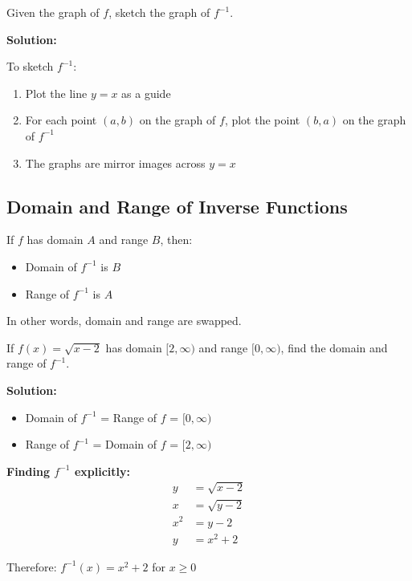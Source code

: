 \documentclass[12pt,a4paper]{article}
\begin{document}
\begin{example}
Given the graph of $f$, sketch the graph of $f^{-1}$.

\textbf{Solution:}

To sketch $f^{-1}$:
\begin{enumerate}
    \item Plot the line $y = x$ as a guide
    \item For each point $(a, b)$ on the graph of $f$, plot the point $(b, a)$ on the graph of $f^{-1}$
    \item The graphs are mirror images across $y = x$
\end{enumerate}
\end{example}

\subsection{Domain and Range of Inverse Functions}

\begin{theorem}
If $f$ has domain $A$ and range $B$, then:
\begin{itemize}
    \item Domain of $f^{-1}$ is $B$
    \item Range of $f^{-1}$ is $A$
\end{itemize}

In other words, domain and range are swapped.
\end{theorem}

\begin{example}
If $f(x) = \sqrt{x - 2}$ has domain $[2, \infty)$ and range $[0, \infty)$, find the domain and range of $f^{-1}$.

\textbf{Solution:}

\begin{itemize}
    \item Domain of $f^{-1}$ = Range of $f$ = $[0, \infty)$
    \item Range of $f^{-1}$ = Domain of $f$ = $[2, \infty)$
\end{itemize}

\textbf{Finding $f^{-1}$ explicitly:}
\begin{align*}
y &= \sqrt{x - 2} \\
x &= \sqrt{y - 2} \\
x^2 &= y - 2 \\
y &= x^2 + 2
\end{align*}

Therefore: $f^{-1}(x) = x^2 + 2$ for $x \geq 0$
\end{example}
\end{document}
